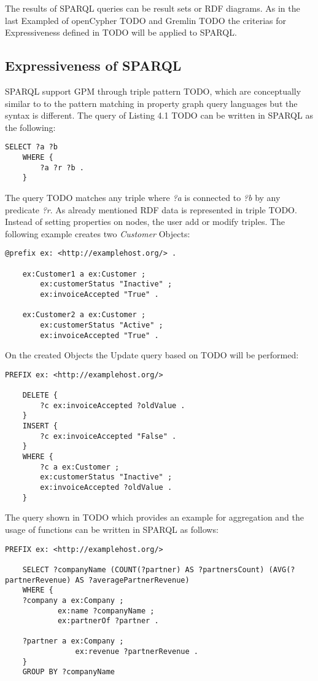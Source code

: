 The results of SPARQL queries can be result sets or RDF diagrams.\newline
As in the last Exampled of openCypher TODO and Gremlin TODO the criterias for Expressiveness
defined in TODO will be applied to SPARQL.

\subsection{Expressiveness of SPARQL}
\label{subsec:different_query_languages_for_graph_databases:sparql:expressiveness}
SPARQL support GPM through triple pattern TODO, which are conceptually similar to 
to the pattern matching in property graph query languages but the syntax is 
different.
The query of Listing 4.1 TODO can be written in SPARQL as the following:
\begin{lstlisting}[caption={Graph Pattern Matching in SPARQL}, label={lst:GPMSPARQL}]
	SELECT ?a ?b
	WHERE {
  		?a ?r ?b .
	}
\end{lstlisting}
The query TODO matches any triple where \textit{?a} is connected to \textit{?b}
by any predicate \textit{?r}.
As already mentioned RDF data is represented in triple TODO. Instead of setting
properties on nodes, the user add or modify triples. The following example
creates two \textit{Customer} Objects:
\begin{lstlisting}[caption={Create Customer Objects in SPARQL}, label={lst:createSPARQL}]
	@prefix ex: <http://examplehost.org/> .

	ex:Customer1 a ex:Customer ;
		ex:customerStatus "Inactive" ;
		ex:invoiceAccepted "True" .

	ex:Customer2 a ex:Customer ;
		ex:customerStatus "Active" ;
		ex:invoiceAccepted "True" .
\end{lstlisting}
On the created Objects the Update query based on TODO will be performed:
\begin{lstlisting}[caption={Update Customer Objects in SPARQL}, label={lst:createSPARQL}]
	PREFIX ex: <http://examplehost.org/>

	DELETE {
		?c ex:invoiceAccepted ?oldValue .
	}
	INSERT {
		?c ex:invoiceAccepted "False" .
	}
	WHERE {
		?c a ex:Customer ;
		ex:customerStatus "Inactive" ;
		ex:invoiceAccepted ?oldValue .
	}
\end{lstlisting}
The query shown in TODO which provides an example for aggregation and the usage of functions 
can be written in SPARQL as follows:
\begin{lstlisting}[caption={Aggregation and Functions in SPARQL}, label={lst:aggFuncSPARQL}]
	PREFIX ex: <http://examplehost.org/>

	SELECT ?companyName (COUNT(?partner) AS ?partnersCount) (AVG(?partnerRevenue) AS ?averagePartnerRevenue)
	WHERE {
	?company a ex:Company ;
			ex:name ?companyName ;
			ex:partnerOf ?partner .
	
	?partner a ex:Company ;
				ex:revenue ?partnerRevenue .
	}
	GROUP BY ?companyName
\end{lstlisting}
